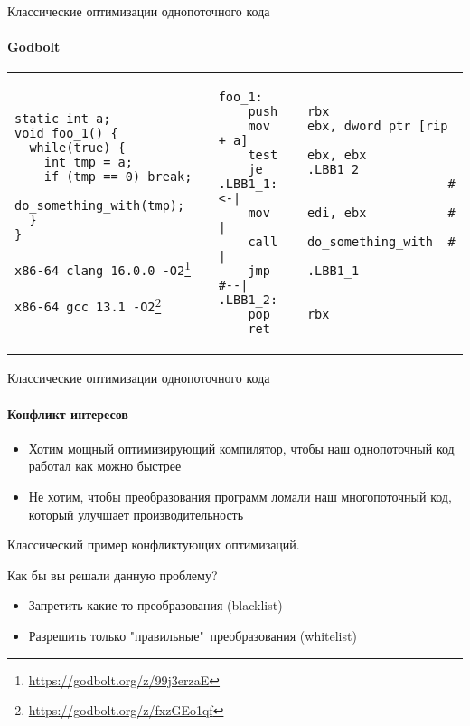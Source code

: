 \begin{frame}{Классические оптимизации однопоточного кода}
\framesubtitle{Godbolt}


\begin{tabular}{p{} p{}}


\begin{verbatim}
static int a;
void foo_1() {
  while(true) {
    int tmp = a;
    if (tmp == 0) break;
    do_something_with(tmp);
  }
}
\end{verbatim}

\texttt{x86-64 clang 16.0.0 -O2}\footnote{\tiny\url{https://godbolt.org/z/99j3erzaE}}

\texttt{x86-64 gcc 13.1 -O2}\footnote{\tiny\url{https://godbolt.org/z/fxzGEo1qf}}

&

\begin{verbatim}
foo_1:                                  
    push    rbx
    mov     ebx, dword ptr [rip + a]
    test    ebx, ebx
    je      .LBB1_2
.LBB1_1:                       #<-|    
    mov     edi, ebx           #  |
    call    do_something_with  #  |
    jmp     .LBB1_1            #--|
.LBB1_2:
    pop     rbx
    ret
\end{verbatim}

\end{tabular}
\end{frame}


\begin{frame}{Классические оптимизации однопоточного кода}
\framesubtitle{Конфликт интересов}

\begin{itemize}
    \item Хотим мощный оптимизирующий компилятор, чтобы наш однопоточный код работал как можно быстрее
    \item Не хотим, чтобы преобразования программ ломали наш многопоточный код, который улучшает производительность
\end{itemize}

\pause
Классический пример конфликтующих оптимизаций.

\pause
Как бы вы решали данную проблему?

\pause
\begin{itemize}
 \item Запретить какие-то преобразования (blacklist)
 \item Разрешить только "правильные"\ преобразования (whitelist)
\end{itemize}

\end{frame}

